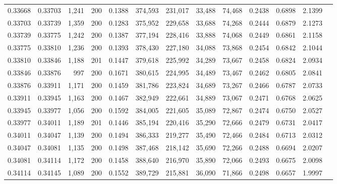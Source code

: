 \begin{tabular}{rrrrrrrrrrrrr}
0.33668 & 0.33703 & 1,241 & 200 &                                     0.1388 & 374,593 & 231,017 &  33,488 &  74,468 & 0.2438 & 0.6898 & 2.1399 \\
0.33703 & 0.33739 & 1,359 & 200 &                                     0.1283 & 375,952 & 229,658 &  33,688 &  74,268 & 0.2444 & 0.6879 & 2.1273 \\
0.33739 & 0.33775 & 1,242 & 200 &                                     0.1387 & 377,194 & 228,416 &  33,888 &  74,068 & 0.2449 & 0.6861 & 2.1158 \\
0.33775 & 0.33810 & 1,236 & 200 &                                     0.1393 & 378,430 & 227,180 &  34,088 &  73,868 & 0.2454 & 0.6842 & 2.1044 \\
0.33810 & 0.33846 & 1,188 & 201 &                                     0.1447 & 379,618 & 225,992 &  34,289 &  73,667 & 0.2458 & 0.6824 & 2.0934 \\
0.33846 & 0.33876 &   997 & 200 &                                     0.1671 & 380,615 & 224,995 &  34,489 &  73,467 & 0.2462 & 0.6805 & 2.0841 \\
0.33876 & 0.33911 & 1,171 & 200 &                                     0.1459 & 381,786 & 223,824 &  34,689 &  73,267 & 0.2466 & 0.6787 & 2.0733 \\
0.33911 & 0.33945 & 1,163 & 200 &                                     0.1467 & 382,949 & 222,661 &  34,889 &  73,067 & 0.2471 & 0.6768 & 2.0625 \\
0.33945 & 0.33977 & 1,056 & 200 &                                     0.1592 & 384,005 & 221,605 &  35,089 &  72,867 & 0.2474 & 0.6750 & 2.0527 \\
0.33977 & 0.34011 & 1,189 & 201 &                                     0.1446 & 385,194 & 220,416 &  35,290 &  72,666 & 0.2479 & 0.6731 & 2.0417 \\
0.34011 & 0.34047 & 1,139 & 200 &                                     0.1494 & 386,333 & 219,277 &  35,490 &  72,466 & 0.2484 & 0.6713 & 2.0312 \\
0.34047 & 0.34081 & 1,135 & 200 &                                     0.1498 & 387,468 & 218,142 &  35,690 &  72,266 & 0.2488 & 0.6694 & 2.0207 \\
0.34081 & 0.34114 & 1,172 & 200 &                                     0.1458 & 388,640 & 216,970 &  35,890 &  72,066 & 0.2493 & 0.6675 & 2.0098 \\
0.34114 & 0.34145 & 1,089 & 200 &                                     0.1552 & 389,729 & 215,881 &  36,090 &  71,866 & 0.2498 & 0.6657 & 1.9997 \\

\end{tabular}
